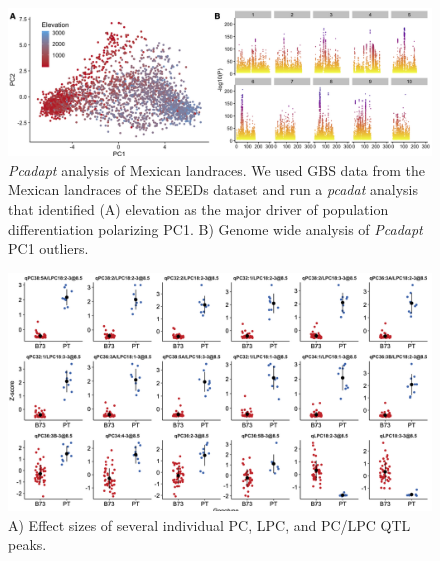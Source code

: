 \documentclass[9pt,twocolumn,twoside,lineno]{BioRxiv}
\begin{document}
\begin{figure}[t]
\begin{center}
\includegraphics[width=0.8\paperwidth]{Sup_Figures/Sup_Fig_2.png}
\caption{\textit{Pcadapt} analysis of Mexican landraces. We used GBS data from the Mexican landraces of the SEEDs dataset \cite{Romero_Navarro2017-cn} and run a \textit{pcadat} analysis \cite{Luu2017-ws} that identified (A) elevation as the major driver of population differentiation polarizing PC1.  
B) Genome wide analysis of \textit{Pcadapt} PC1 outliers. 
}
\label{SupFig2}
\end{center}
\end{figure} 

\clearpage

\begin{figure}[t]
\begin{center}
\includegraphics[width=0.8\paperwidth]{Sup_Figures/Sup_Fig_3.png}
\caption{A) Effect sizes of several individual PC, LPC, and PC/LPC QTL peaks.
}
\label{SupFig4}
\end{center}
\end{figure}  
\end{document}
